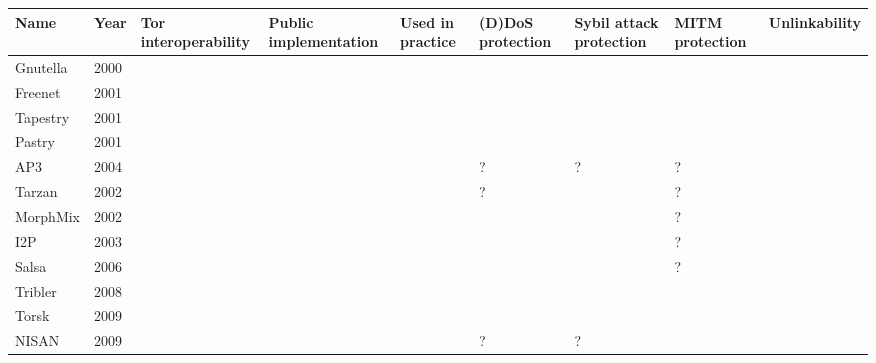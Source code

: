 \begin{tabular}[p]{| l | l | p{2.5cm} | p{2.5cm} | p{2.5cm} | p{2.5cm} | p{2.5cm} | p{2.5cm} | p{2.5cm} |}
	\hline
	\textbf{Name} & \textbf{Year} & \textbf{Tor interoperability} & \textbf{Public implementation} & \textbf{Used in \newline practice} & \textbf{(D)DoS protection} & \textbf{Sybil attack protection} & \textbf{MITM \newline protection} & \textbf{Unlinkability} \\ \hline

	Gnutella & 2000 & \xmark & \checkmark & \checkmark & \xmark & \xmark & \xmark & \xmark \\ \hline
	Freenet & 2001 & \xmark & \checkmark & \checkmark & \checkmark & \xmark & \xmark & \checkmark \\ \hline
	Tapestry & 2001 & \xmark & \checkmark & \checkmark & \checkmark & \xmark & \xmark & \xmark \\ \hline
	Pastry & 2001 & \xmark & \checkmark & \checkmark & \checkmark & \xmark & \xmark & \xmark \\ \hline
	AP3 & 2004 & \xmark & \xmark & \xmark & ? & ? & ? & \checkmark \\ \hline
	Tarzan & 2002 & \xmark & \xmark & \xmark & ? & \checkmark & ? & \checkmark \\ \hline
	MorphMix & 2002 & \xmark & \checkmark & \xmark & \checkmark & \xmark & ? & \checkmark \\ \hline
	I2P & 2003 & \xmark & \checkmark & \checkmark & \checkmark & \checkmark & ? & \checkmark\\ \hline
	Salsa & 2006 & \xmark & \xmark & \xmark & \checkmark & \checkmark & ? & \checkmark \\ \hline
	Tribler & 2008 & \xmark & \checkmark & \checkmark & \checkmark & \xmark & \xmark & \xmark \\ \hline
	Torsk & 2009 & \checkmark & \xmark & \xmark & \checkmark & \checkmark & \checkmark & \checkmark \\ \hline
	NISAN & 2009 & \xmark & \xmark & \xmark & ? & ? & \checkmark & \checkmark \\ \hline		
\end{tabular}
